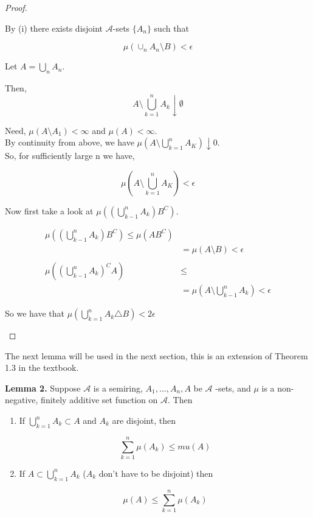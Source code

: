 \documentclass[11pt,fleqn]{book} %
\begin{document}
\begin{proof}
\begin{enumerate}
	By (i) there exists disjoint $\mathcal{A}$-sets $\{A_n\}$ such that 

			$$\mu(\cup_n A_n \setminus B) < \epsilon $$

	Let $A = \bigcup_n A_n$. 

	Then, 	
			$$A \setminus \bigcup^n_{k=1} A_k \downarrow \emptyset $$

	Need, $\mu(A\setminus A_1) < \infty$ and $\mu(A) < \infty$. \\

	By continuity from above, we have $\mu(A \setminus \bigcup^n_{k=1} A_K ) \downarrow 0$.\\


	So, for sufficiently large n we have, 	

			$$ \mu(A \setminus \bigcup^n_{k=1} A_K ) <  \epsilon$$

	Now first take a look at $\mu((\bigcup^n_{k-1} A_k) B^C)$.


		\begin{align*}
			\mu((\bigcup^n_{k-1} A_k) B^C) \leq \mu(A B^C)\\
				&= \mu(A \setminus B) < \epsilon\\
				\\
			\mu((\bigcup^n_{k-1} A_k)^C A) &\leq \\
					&= \mu(A \setminus \bigcup^n_{k-1} A_k) < \epsilon
 		\end{align*}


 	So we have that 
 			$\mu(\bigcup^n_{k=1} A_k \triangle B) < 2\epsilon$
	\end{enumerate}
\end{proof}


The next lemma will be used in the next section, this is an extension of Theorem 1.3 in the textbook. 

\textbf{Lemma 2.} Suppose $\mathcal{A}$ is a semiring, $A_1, \dots, A_n, A$ be $\mathcal{A}$ -sets, and $\mu$ is a non-negative, finitely additive set function on $\mathcal{A}$. Then


	\begin{enumerate}
	 	\item If $\bigcup^n_{k=1} A_k \subset A$ and $A_k$ are disjoint, then
	 			
	 			$$ \sum^n_{k=1} \mu(A_k) \leq mu(A) $$

	 	\item If $A \subset \bigcup^n_{k=1} A_k$ ($A_k$ don't have to be disjoint) then
	 			
	 			$$ \mu(A) \leq \sum^n_{k=1} \mu(A_k)$$

	 \end{enumerate} 
\end{document}
